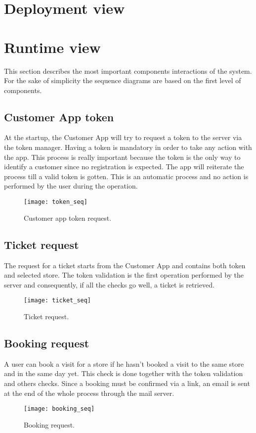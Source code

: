 \section{Deployment view}

\clearpage
\section{Runtime view}
This section describes the most important components interactions of the system.\newline
For the sake of simplicity the sequence diagrams are based on the first level of components. 
\subsection{Customer App token}
At the startup, the Customer App will try to request a token to the server via the token manager. Having a token is mandatory in order to take any action with the app.\newline
This process is really important because the token is the only way to identify a customer since no registration is expected. The app will reiterate the process till a valid token is gotten.\newline
This is an automatic process and no action is performed by the user during the operation.
\begin{figure}[H]
	\centering
	\texttt{[image: token\_seq]}
	\caption{Customer app token request.}
	\label{fig:token_seq}
\end{figure}
\clearpage

\subsection{Ticket request}
The request for a ticket starts from the Customer App and contains both token and selected store. The token validation is the first operation performed by the server and consequently, if all the checks go well, a ticket is retrieved.
\vspace{0.1cm}
\begin{figure}[H]
	\centering
	\texttt{[image: ticket\_seq]}
	\caption{Ticket request.}
	\label{fig:ticket_seq}
\end{figure}

\clearpage

\subsection{Booking request}
A user can book a visit for a store if he hasn't booked a visit to the same store and in the same day yet. This check is done together with the token validation and others checks.\newline
Since a booking must be confirmed via a link, an email is sent at the end of the whole process through the mail server.
\begin{figure}[H]
	\centering
	\texttt{[image: booking\_seq]}
	\caption{Booking request.}
	\label{fig:booking_seq}
\end{figure}

